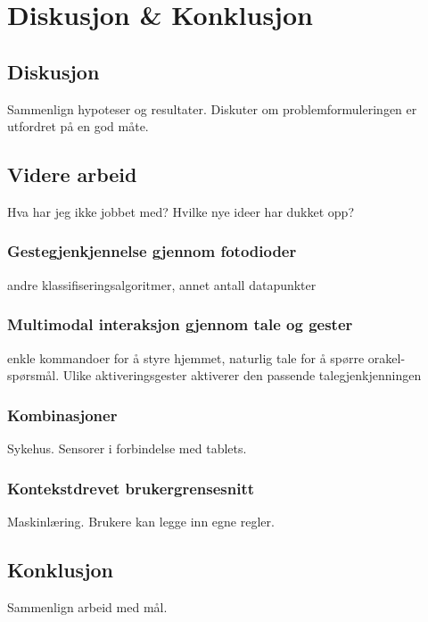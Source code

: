 \section[Diskusjon \& Konklusjon]{Diskusjon \& Konklusjon}
\subsection{Diskusjon}
{\color{red}Sammenlign hypoteser og resultater. Diskuter om problemformuleringen er utfordret på en god måte.}

\subsection{Videre arbeid}
{\color{red}Hva har jeg ikke jobbet med? Hvilke nye ideer har dukket opp?}

\subsubsection*{Gestegjenkjennelse gjennom fotodioder}
andre klassifiseringsalgoritmer, annet antall datapunkter

\subsubsection*{Multimodal interaksjon gjennom tale og gester}
enkle kommandoer for å styre hjemmet, naturlig tale for å spørre orakel-spørsmål. Ulike aktiveringsgester aktiverer den passende talegjenkjenningen

\subsubsection*{Kombinasjoner}
Sykehus.
Sensorer i forbindelse med tablets.

\subsubsection*{Kontekstdrevet brukergrensesnitt}
Maskinlæring.
Brukere kan legge inn egne regler.


\subsection{Konklusjon}
{\color{red}Sammenlign arbeid med mål.}